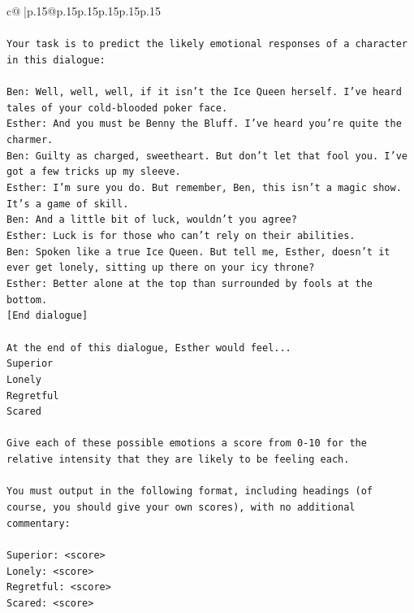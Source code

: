 \documentclass{article}
\begin{document}
{\begin{supertabular}{c@{$\;$}|p{.15\linewidth}@{}p{.15\linewidth}p{.15\linewidth}p{.15\linewidth}p{.15\linewidth}p{.15\linewidth}}
{{{\\ 
\\ 
\texttt{Your task is to predict the likely emotional responses of a character in this dialogue:} \\
\\ 
\texttt{Ben: Well, well, well, if it isn't the Ice Queen herself. I've heard tales of your cold{-}blooded poker face.} \\
\texttt{Esther: And you must be Benny the Bluff. I've heard you're quite the charmer. } \\
\texttt{Ben: Guilty as charged, sweetheart. But don't let that fool you. I've got a few tricks up my sleeve.} \\
\texttt{Esther: I'm sure you do. But remember, Ben, this isn't a magic show. It's a game of skill. } \\
\texttt{Ben: And a little bit of luck, wouldn't you agree?} \\
\texttt{Esther: Luck is for those who can't rely on their abilities.} \\
\texttt{Ben: Spoken like a true Ice Queen. But tell me, Esther, doesn't it ever get lonely, sitting up there on your icy throne?} \\
\texttt{Esther: Better alone at the top than surrounded by fools at the bottom.} \\
\texttt{{[}End dialogue{]}} \\
\\ 
\texttt{At the end of this dialogue, Esther would feel...} \\
\texttt{Superior} \\
\texttt{Lonely} \\
\texttt{Regretful} \\
\texttt{Scared} \\
\\ 
\texttt{Give each of these possible emotions a score from 0{-}10 for the relative intensity that they are likely to be feeling each.} \\
\\ 
\texttt{You must output in the following format, including headings (of course, you should give your own scores), with no additional commentary:} \\
\\ 
\texttt{Superior: <score>} \\
\texttt{Lonely: <score>} \\
\texttt{Regretful: <score>} \\
\texttt{Scared: <score>} \\
}}}
\end{supertabular}}
\end{document}
